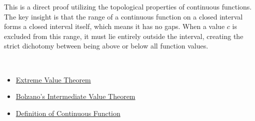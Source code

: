 \begin{remark*}
This is a direct proof utilizing the topological properties of continuous functions. The key insight is that the range of a continuous function on a closed interval forms a closed interval itself, which means it has no gaps. When a value $c$ is excluded from this range, it must lie entirely outside the interval, creating the strict dichotomy between being above or below all function values.
\end{remark*}

\begin{remark*}[Dependencies]~\\
\begin{itemize}
  \item \hyperref[thm:extreme-value-theorem]{Extreme Value Theorem}
  \item \hyperref[thm:bolzano-intermediate-value]{Bolzano's Intermediate Value Theorem}
  \item \hyperref[def:continuous-function]{Definition of Continuous Function}
\end{itemize}
\end{remark*}
